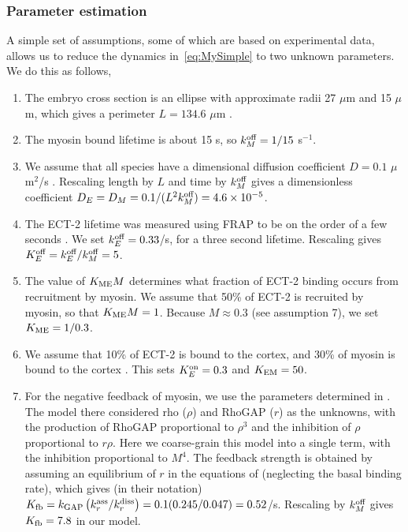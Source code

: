 \documentclass[11pt]{article}
\newcommand{\red}[1]{\color{red}#1\normalcolor}
\begin{document}
\subsubsection{Parameter estimation}
A simple set of assumptions, some of which are based on experimental data, allows us to reduce the dynamics in\ \eqref{eq:MySimple} to two unknown parameters. We do this as follows, 
\begin{enumerate}
\item The embryo cross section is an ellipse with approximate radii 27 $\mu$m and 15 $\mu$m, which gives a perimeter $L=134.6$ $\mu$m \cite{goehring2011polarization} .
\item \red{The myosin bound lifetime is about 15 s, so $k^\text{off}_M=1/15$ s$^{-1}$. }
\item We assume that all species have a dimensional diffusion coefficient $D=0.1$ $\mu$m$^2$/s \cite{goehring2011polarization, gross2019guiding, robin2014single}. Rescaling length by $L$ and time by $k^\text{off}_M$ gives a dimensionless coefficient $D_E=D_M=0.1/(L^2 k^\text{off}_M)=4.6 \times 10^{-5}$. 
\item The ECT-2 lifetime was measured using FRAP to be on the order of a few seconds \cite{longhini2022aurora}. \red{We set $k^\text{off}_E=0.33$/s, for a three second lifetime.} Rescaling gives $K^\text{off}_E=k^\text{off}_E/k^\text{off}_M=5$. 
\item The value of $K_\text{ME} M$ determines what fraction of ECT-2 binding occurs from recruitment by myosin. We assume that 50\% of ECT-2 is recruited by myosin, so that $K_\text{ME} M = 1$. Because $M \approx 0.3$ (see assumption 7), we set $K_\text{ME}=1/0.3$. 
\item We assume that 10\% of ECT-2 is bound to the cortex, and 30\% of myosin is bound to the cortex \cite[Fig.~S3j]{gross2019guiding}. This sets $K^\text{on}_E=0.3$ and $K_\text{EM} = 50$. 
\item For the negative feedback of myosin, we use the parameters determined in \cite{michaux2018excitable}. The model there considered rho ($\rho$) and RhoGAP ($r$) as the unknowns, with the production of RhoGAP proportional to $\rho^3$ and the inhibition of $\rho$ proportional to $r \rho$. Here we coarse-grain this model into a single term, with the inhibition proportional to $M^4$. The feedback strength is obtained by assuming an equilibrium of $r$ in the equations of \cite{michaux2018excitable} (neglecting the basal binding rate), which gives (in their notation) $K_\text{fb}=k_\text{GAP}\left(k_r^\text{ass}/k_r^\text{diss}\right)=0.1(0.245/0.047)=0.52$/s. Rescaling by $k^\text{off}_M$ gives $K_\text{fb}=7.8$ in our model. 
\end{enumerate}
\end{document}
